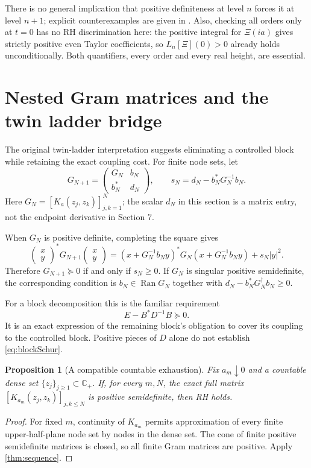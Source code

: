 \documentclass[11pt,letterpaper]{article}
\numberwithin{equation}{section}
\newtheorem{proposition}[theorem]{Proposition}
\theoremstyle{definition}
\theoremstyle{remark}
\newcommand{\Cp}{\mathbb C_+}
\begin{document}
There is no general implication that positive definiteness at level $n$ forces it at level $n+1$; explicit counterexamples are given in \cite{csordas}. Also, checking all orders only at $t=0$ has no RH discrimination here: the positive integral for $\Xi(ia)$ gives strictly positive even Taylor coefficients, so $L_n[\Xi](0)>0$ already holds unconditionally. Both quantifiers, every order and every real height, are essential.

\section{Nested Gram matrices and the twin ladder bridge}
The original twin-ladder interpretation suggests eliminating a controlled block while retaining the exact coupling cost. For finite node sets, let
\begin{equation}\label{eq:schur}
G_{N+1}=\begin{pmatrix}G_N&b_N\\b_N^*&d_N\end{pmatrix},\qquad
s_N=d_N-b_N^*G_N^{-1}b_N.
\end{equation}
Here $G_N=[K_a(z_j,z_k)]_{j,k=1}^N$; the scalar $d_N$ in this section is a matrix entry, not the endpoint derivative in Section 7.

When $G_N$ is positive definite, completing the square gives
\begin{equation}\label{eq:completeSquare}
\begin{pmatrix}x\\y\end{pmatrix}^{\!*}G_{N+1}
\begin{pmatrix}x\\y\end{pmatrix}
=(x+G_N^{-1}b_Ny)^*G_N(x+G_N^{-1}b_Ny)+s_N|y|^2.
\end{equation}
Therefore $G_{N+1}\succeq0$ if and only if $s_N\ge0$. If $G_N$ is singular positive semidefinite, the corresponding condition is $b_N\in\operatorname{Ran}G_N$ together with $d_N-b_N^*G_N^\dagger b_N\ge0$.

For a block decomposition this is the familiar requirement
\begin{equation}\label{eq:blockSchur}
E-B^*D^{-1}B\succeq0.
\end{equation}
It is an exact expression of the remaining block's obligation to cover its coupling to the controlled block. Positive pieces of $D$ alone do not establish \eqref{eq:blockSchur}.

\begin{proposition}[A compatible countable exhaustion]\label{prop:exhaust}
Fix $a_m\downarrow0$ and a countable dense set $\{z_j\}_{j\ge1}\subset\Cp$. If, for every $m,N$, the exact full matrix $[K_{a_m}(z_j,z_k)]_{j,k\le N}$ is positive semidefinite, then RH holds.
\end{proposition}
\begin{proof}
For fixed $m$, continuity of $K_{a_m}$ permits approximation of every finite upper-half-plane node set by nodes in the dense set. The cone of finite positive semidefinite matrices is closed, so all finite Gram matrices are positive. Apply \cref{thm:sequence}.
\end{proof}
\end{document}
